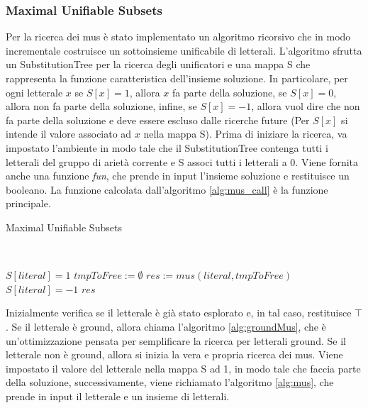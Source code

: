 \documentclass[./main.tex]{subfiles}
\begin{document}
\subsubsection{Maximal Unifiable Subsets}

Per la ricerca dei mus è stato implementato un algoritmo ricorsivo che in modo incrementale costruisce un sottoinsieme unificabile di letterali.
L'algoritmo sfrutta un SubstitutionTree per la ricerca degli unificatori e una mappa S che rappresenta la funzione caratteristica 
dell'insieme soluzione. 
In particolare, per ogni letterale $x$ se $S[x] = 1$, allora $x$ fa parte della soluzione, se $S[x] = 0$, allora non fa parte della soluzione,
infine, se $S[x] = -1$, allora vuol dire che non fa parte della soluzione e deve essere escluso dalle ricerche future
(Per $S[x]$ si intende il valore associato ad $x$ nella mappa S).
Prima di iniziare la ricerca, va impostato l'ambiente in modo tale che il SubstitutionTree contenga tutti i letterali 
del gruppo di arietà corrente e S associ tutti i letterali a 0. 
Viene fornita anche una funzione \textit{fun}, che prende in input l'insieme soluzione e restituisce un booleano.
La funzione calcolata dall'algoritmo \ref{alg:mus_call} è la funzione principale. 






\begin{algorithm}[H] \label{alg:mus_call}
    \caption{Maximal Unifiable Subsets}
    \\

\nl {}
\nl {}

$S[literal] = 1$\;
$tmpToFree := \emptyset$\;
$res := mus(literal, tmpToFree)$\;
$S[literal] = -1$\;
\Return $res$\;
\end{algorithm}

Inizialmente verifica se il letterale è già stato esplorato e, in tal caso, restituisce $\top$.
Se il letterale è ground, allora chiama l'algoritmo \ref{alg:groundMus}, che è un'ottimizzazione pensata 
per semplificare la ricerca per letterali ground.
Se il letterale non è ground, allora si inizia la vera e propria ricerca dei mus.
Viene impostato il valore del letterale nella mappa S ad 1, in modo tale che faccia parte della soluzione,
successivamente, viene richiamato l'algoritmo \ref{alg:mus},
che prende in input il letterale e un insieme di letterali.
\end{document}
